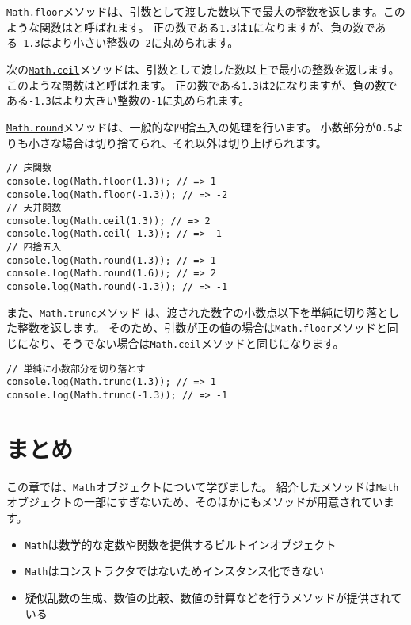 \href{https://developer.mozilla.org/ja/docs/Web/JavaScript/Reference/Global_Objects/Math/floor}{\texttt{Math.floor}}メソッドは、引数として渡した数以下で最大の整数を返します。このような関数は\textbf{}と呼ばれます。
正の数である\texttt{1.3}は\texttt{1}になりますが、負の数である\texttt{-1.3}はより小さい整数の\texttt{-2}に丸められます。

次の\href{https://developer.mozilla.org/ja/docs/Web/JavaScript/Reference/Global_Objects/Math/ceil}{\texttt{Math.ceil}}メソッドは、引数として渡した数以上で最小の整数を返します。このような関数は\textbf{}と呼ばれます。
正の数である\texttt{1.3}は\texttt{2}になりますが、負の数である\texttt{-1.3}はより大きい整数の\texttt{-1}に丸められます。

\href{https://developer.mozilla.org/ja/docs/Web/JavaScript/Reference/Global_Objects/Math/round}{\texttt{Math.round}}メソッドは、一般的な四捨五入の処理を行います。
小数部分が\texttt{0.5}よりも小さな場合は切り捨てられ、それ以外は切り上げられます。

\begin{lstlisting}
// 床関数
console.log(Math.floor(1.3)); // => 1
console.log(Math.floor(-1.3)); // => -2
// 天井関数
console.log(Math.ceil(1.3)); // => 2
console.log(Math.ceil(-1.3)); // => -1
// 四捨五入
console.log(Math.round(1.3)); // => 1
console.log(Math.round(1.6)); // => 2
console.log(Math.round(-1.3)); // => -1
\end{lstlisting}

また、\href{https://developer.mozilla.org/ja/docs/Web/JavaScript/Reference/Global_Objects/Math/trunc}{\texttt{Math.trunc}}メソッド\,\protect{}\,は、渡された数字の小数点以下を単純に切り落とした整数を返します。
そのため、引数が正の値の場合は\texttt{Math.floor}メソッドと同じになり、そうでない場合は\texttt{Math.ceil}メソッドと同じになります。

\begin{lstlisting}
// 単純に小数部分を切り落とす
console.log(Math.trunc(1.3)); // => 1
console.log(Math.trunc(-1.3)); // => -1
\end{lstlisting}

\hypertarget{conclusion}{%
\section{まとめ}\label{conclusion}}

この章では、\texttt{Math}オブジェクトについて学びました。
紹介したメソッドは\texttt{Math}オブジェクトの一部にすぎないため、そのほかにもメソッドが用意されています。

\begin{itemize}
\item
  \texttt{Math}は数学的な定数や関数を提供するビルトインオブジェクト
\item
  \texttt{Math}はコンストラクタではないためインスタンス化できない
\item
  疑似乱数の生成、数値の比較、数値の計算などを行うメソッドが提供されている
\end{itemize}
